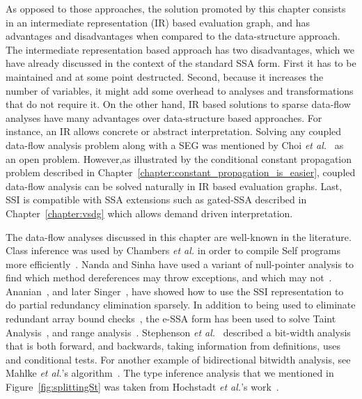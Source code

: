{As opposed to those approaches, the solution promoted by this chapter consists in an intermediate representation (IR) based evaluation graph, and has advantages and disadvantages when compared to the data-structure approach.
The intermediate representation based approach has two disadvantages, which we have already discussed in the context of the standard SSA form.
First it has to be maintained and at some point destructed.
Second, because it increases the number of variables, it might add some overhead to analyses and transformations that do not require it.
On the other hand, IR based solutions to sparse data-flow analyses have many advantages over data-structure based approaches.
For instance, an IR allows concrete or abstract interpretation.
Solving any coupled data-flow analysis problem along with a SEG was mentioned by Choi {\em et al.}~\cite{Choi91} as an open problem.
However,\ifconstantprop as illustrated by the conditional constant propagation problem described in Chapter~\ref{chapter:constant_propagation_is_easier}\fi, coupled data-flow analysis can be solved naturally in IR based evaluation graphs.
Last, SSI is compatible with SSA extensions such as gated-SSA described in Chapter~\ref{chapter:vsdg} which allows demand driven interpretation.

The data-flow analyses discussed in this chapter are well-known in the literature.
Class inference was used by Chambers {\em et al.} in order to compile Self programs more efficiently~\cite{Chambers89}.
Nanda and Sinha have used a variant of null-pointer analysis to find which method dereferences may throw exceptions, and which may not~\cite{Nanda09}.
Ananian~\cite{Ananian99}, and later Singer~\cite{Singer06}, have showed how to use the SSI representation to do partial redundancy elimination sparsely.
In addition to being used to eliminate redundant array bound checks~\cite{Bodik00}, the e-SSA form has been used to solve Taint Analysis~\cite{Rimsa11}, and range analysis~\cite{Su05,Gawlitza09}.
Stephenson {\em et al.}~\cite{Stephenson00} described a bit-width analysis that is both forward, and backwards, taking information from definitions, uses and conditional tests.
For another example of bidirectional bitwidth analysis, see Mahlke {\em et al.}'s algorithm~\cite{Mahlke01}.
The type inference analysis that we mentioned in Figure~\ref{fig:splittingSt} was taken from Hochstadt {\em et al.}'s work~\cite{Hochstadt08}.

}
